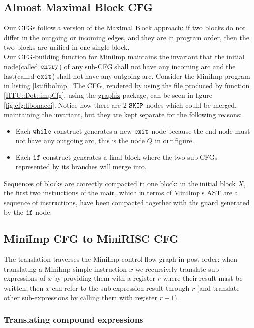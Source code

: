 \documentclass[a4paper,11pt]{report}
\begin{document}
\subsection{Almost Maximal Block CFG}
Our CFGs follow a version of the Maximal Block approach:  if two blocks do not differ in the outgoing or incoming edges, and they are in program order, then the two blocks are unified in one single block.
\\
Our CFG-building function for \hyperref[Section::MiniImp]{MiniImp} maintains the invariant that the initial node(called $\verb|entry|$) of any sub-CFG shall not have any incoming arc and the last(called $\verb|exit|$) shall not have any outgoing arc.
Consider the MiniImp program in listing \ref{lst:fiboImp}. The CFG, rendered by using the file produced by function \ref{HTU::Dot::impCfg}, using the \href{https://graphviz.org/download/}{graphiz} package, can be seen in figure \ref{fig:cfg:fibonacci}.
Notice how there are 2 $\verb|SKIP|$ nodes which could be merged, maintaining the invariant, but they are kept separate for the following reasons:
\begin{itemize}
  \item Each $\verb|while|$ construct generates a new $\verb|exit|$ node because the end node must not have any outgoing arc, this is the node $Q$ in our figure.
  \item Each $\verb|if|$ construct generates a final block where the two sub-CFGs represented by its branches will merge into. 
 \end{itemize}
Sequences of blocks are correctly compacted in one block: in the initial block $X$, the first two instructions of the main, which in terms of MiniImp's AST are a sequence of instructions, have been compacted together with the guard generated by the $\verb|if|$ node.

\subsection{MiniImp CFG to MiniRISC CFG}

The translation traverses the MiniImp control-flow graph in post-order: when translating a MiniImp simple instruction $x$ we recursively translate sub-expressions of $x$ by providing them with a register $r$ where their result must be written, then $x$ can refer to the sub-expression result through $r$ (and translate other sub-expressions by calling them with register $r+1$).

\subsubsection{Translating compound expressions}
\end{document}
